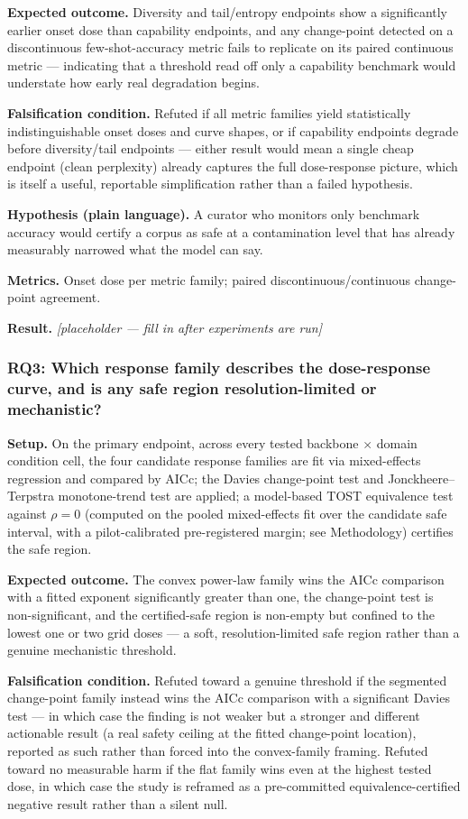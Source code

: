 \documentclass[11pt]{article}
\newcommand{\ph}{\textit{[placeholder --- fill in after experiments are run]}}
\begin{document}
\textbf{Expected outcome.} Diversity and tail/entropy endpoints show a significantly earlier onset dose than capability endpoints, and any change-point detected on a discontinuous few-shot-accuracy metric fails to replicate on its paired continuous metric --- indicating that a threshold read off only a capability benchmark would understate how early real degradation begins.

\textbf{Falsification condition.} Refuted if all metric families yield statistically indistinguishable onset doses and curve shapes, or if capability endpoints degrade before diversity/tail endpoints --- either result would mean a single cheap endpoint (clean perplexity) already captures the full dose-response picture, which is itself a useful, reportable simplification rather than a failed hypothesis.

\textbf{Hypothesis (plain language).} A curator who monitors only benchmark accuracy would certify a corpus as safe at a contamination level that has already measurably narrowed what the model can say.

\textbf{Metrics.} Onset dose per metric family; paired discontinuous/continuous change-point agreement.

\textbf{Result.} \ph

\subsubsection{RQ3: Which response family describes the dose-response curve, and is any safe region resolution-limited or mechanistic?}
\textbf{Setup.} On the primary endpoint, across every tested backbone $\times$ domain condition cell, the four candidate response families are fit via mixed-effects regression and compared by AICc; the Davies change-point test and Jonckheere--Terpstra monotone-trend test are applied; a model-based TOST equivalence test against $\rho = 0$ (computed on the pooled mixed-effects fit over the candidate safe interval, with a pilot-calibrated pre-registered margin; see Methodology) certifies the safe region.

\textbf{Expected outcome.} The convex power-law family wins the AICc comparison with a fitted exponent significantly greater than one, the change-point test is non-significant, and the certified-safe region is non-empty but confined to the lowest one or two grid doses --- a soft, resolution-limited safe region rather than a genuine mechanistic threshold.

\textbf{Falsification condition.} Refuted toward a genuine threshold if the segmented change-point family instead wins the AICc comparison with a significant Davies test --- in which case the finding is not weaker but a stronger and different actionable result (a real safety ceiling at the fitted change-point location), reported as such rather than forced into the convex-family framing. Refuted toward no measurable harm if the flat family wins even at the highest tested dose, in which case the study is reframed as a pre-committed equivalence-certified negative result rather than a silent null.
\end{document}
